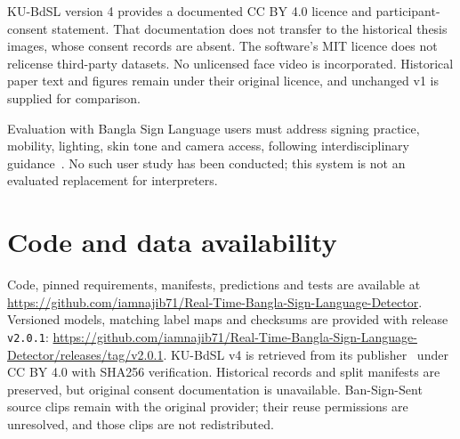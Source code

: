 \documentclass[11pt,a4paper]{article}
\begin{document}
KU-BdSL version 4 provides a documented CC BY 4.0 licence and participant-consent statement. That documentation does not transfer to the historical thesis images, whose consent records are absent. The software's MIT licence does not relicense third-party datasets. No unlicensed face video is incorporated. Historical paper text and figures remain under their original licence, and unchanged v1 is supplied for comparison.

Evaluation with Bangla Sign Language users must address signing practice, mobility, lighting, skin tone and camera access, following interdisciplinary guidance~\cite{bragg}. No such user study has been conducted; this system is not an evaluated replacement for interpreters.
\section{Code and data availability}
Code, pinned requirements, manifests, predictions and tests are available at \url{https://github.com/iamnajib71/Real-Time-Bangla-Sign-Language-Detector}. Versioned models, matching label maps and checksums are provided with release \texttt{v2.0.1}: \url{https://github.com/iamnajib71/Real-Time-Bangla-Sign-Language-Detector/releases/tag/v2.0.1}. KU-BdSL v4 is retrieved from its publisher~\cite{kudata} under CC BY 4.0 with SHA256 verification. Historical records and split manifests are preserved, but original consent documentation is unavailable. Ban-Sign-Sent source clips remain with the original provider; their reuse permissions are unresolved, and those clips are not redistributed.
\end{document}
